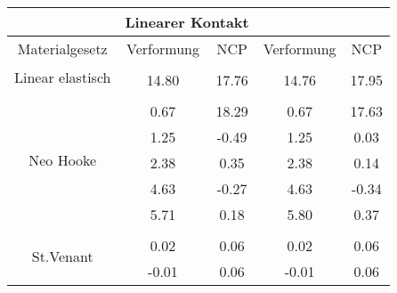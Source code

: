 \begin{table} 
\centering 
\begin{tabular}{c|cc|cc|} 
\cline{2-5} 
 & \multicolumn{2}{|c|}{Linearer Kontakt} &  \\ 
\hline 
\multicolumn{1}{|c|}{Materialgesetz} & \multicolumn{1}{c|}{Verformung} & \multicolumn{1}{c|}{NCP} & \multicolumn{1}{c|}{Verformung} & \multicolumn{1}{c|}{NCP} \\ 
\hline 
\multicolumn{1}{|c|}{\multirow{2}{*}{Linear elastisch}} &\multicolumn{1}{|c|}{} & \multicolumn{1}{|c|}{} & \multicolumn{1}{|c|}{} & \multicolumn{1}{|c|}{} \\ 
\multicolumn{1}{|c|}{} & \multicolumn{1}{|c|}{     14.80} & \multicolumn{1}{|c|}{     17.76} & \multicolumn{1}{|c|}{     14.76} & \multicolumn{1}{|c|}{     17.95} \\ 
\hline 
\multicolumn{1}{|c|}{\multirow{6}{*}{Neo Hooke}} &\multicolumn{1}{|c|}{} & \multicolumn{1}{|c|}{} & \multicolumn{1}{|c|}{} & \multicolumn{1}{|c|}{} \\ 
\multicolumn{1}{|c|}{} & \multicolumn{1}{|c|}{      0.67} & \multicolumn{1}{|c|}{     18.29} & \multicolumn{1}{|c|}{      0.67} & \multicolumn{1}{|c|}{     17.63} \\ 
\multicolumn{1}{|c|}{} & \multicolumn{1}{|c|}{      1.25} & \multicolumn{1}{|c|}{     -0.49} & \multicolumn{1}{|c|}{      1.25} & \multicolumn{1}{|c|}{      0.03} \\ 
\multicolumn{1}{|c|}{} & \multicolumn{1}{|c|}{      2.38} & \multicolumn{1}{|c|}{      0.35} & \multicolumn{1}{|c|}{      2.38} & \multicolumn{1}{|c|}{      0.14} \\ 
\multicolumn{1}{|c|}{} & \multicolumn{1}{|c|}{      4.63} & \multicolumn{1}{|c|}{     -0.27} & \multicolumn{1}{|c|}{      4.63} & \multicolumn{1}{|c|}{     -0.34} \\ 
\multicolumn{1}{|c|}{} & \multicolumn{1}{|c|}{      5.71} & \multicolumn{1}{|c|}{      0.18} & \multicolumn{1}{|c|}{      5.80} & \multicolumn{1}{|c|}{      0.37} \\ 
\hline 
\multicolumn{1}{|c|}{\multirow{8}{*}{St.Venant}} &\multicolumn{1}{|c|}{} & \multicolumn{1}{|c|}{} & \multicolumn{1}{|c|}{} & \multicolumn{1}{|c|}{} \\ 
\multicolumn{1}{|c|}{} & \multicolumn{1}{|c|}{      0.02} & \multicolumn{1}{|c|}{      0.06} & \multicolumn{1}{|c|}{      0.02} & \multicolumn{1}{|c|}{      0.06} \\ 
\multicolumn{1}{|c|}{} & \multicolumn{1}{|c|}{     -0.01} & \multicolumn{1}{|c|}{      0.06} & \multicolumn{1}{|c|}{     -0.01} & \multicolumn{1}{|c|}{      0.06} \\ 

\end{tabular}
\end{table}
